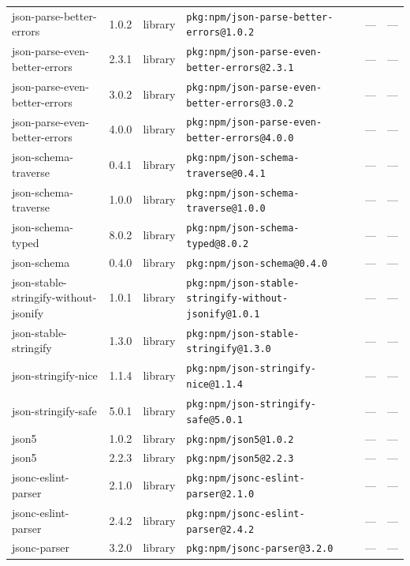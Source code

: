 \documentclass[11pt,a4paper]{article}
\begin{document}
\begin{longtable}{|p{4cm}|p{2cm}|p{1.6cm}|p{5cm}|p{1.5cm}|p{3.5cm}|}
\raggedright json-parse-better-errors & 1.0.2 & library & \small\texttt{pkg:npm/json-parse-better-errors@1.0.2} & — & \small — \\
\raggedright json-parse-even-better-errors & 2.3.1 & library & \small\texttt{pkg:npm/json-parse-even-better-errors@2.3.1} & — & \small — \\
\raggedright json-parse-even-better-errors & 3.0.2 & library & \small\texttt{pkg:npm/json-parse-even-better-errors@3.0.2} & — & \small — \\
\raggedright json-parse-even-better-errors & 4.0.0 & library & \small\texttt{pkg:npm/json-parse-even-better-errors@4.0.0} & — & \small — \\
\raggedright json-schema-traverse & 0.4.1 & library & \small\texttt{pkg:npm/json-schema-traverse@0.4.1} & — & \small — \\
\raggedright json-schema-traverse & 1.0.0 & library & \small\texttt{pkg:npm/json-schema-traverse@1.0.0} & — & \small — \\
\raggedright json-schema-typed & 8.0.2 & library & \small\texttt{pkg:npm/json-schema-typed@8.0.2} & — & \small — \\
\raggedright json-schema & 0.4.0 & library & \small\texttt{pkg:npm/json-schema@0.4.0} & — & \small — \\
\raggedright json-stable-stringify-without-jsonify & 1.0.1 & library & \small\texttt{pkg:npm/json-stable-stringify-without-jsonify@1.0.1} & — & \small — \\
\raggedright json-stable-stringify & 1.3.0 & library & \small\texttt{pkg:npm/json-stable-stringify@1.3.0} & — & \small — \\
\raggedright json-stringify-nice & 1.1.4 & library & \small\texttt{pkg:npm/json-stringify-nice@1.1.4} & — & \small — \\
\raggedright json-stringify-safe & 5.0.1 & library & \small\texttt{pkg:npm/json-stringify-safe@5.0.1} & — & \small — \\
\raggedright json5 & 1.0.2 & library & \small\texttt{pkg:npm/json5@1.0.2} & — & \small — \\
\raggedright json5 & 2.2.3 & library & \small\texttt{pkg:npm/json5@2.2.3} & — & \small — \\
\raggedright jsonc-eslint-parser & 2.1.0 & library & \small\texttt{pkg:npm/jsonc-eslint-parser@2.1.0} & — & \small — \\
\raggedright jsonc-eslint-parser & 2.4.2 & library & \small\texttt{pkg:npm/jsonc-eslint-parser@2.4.2} & — & \small — \\
\raggedright jsonc-parser & 3.2.0 & library & \small\texttt{pkg:npm/jsonc-parser@3.2.0} & — & \small — \\

\end{longtable}
\end{document}
